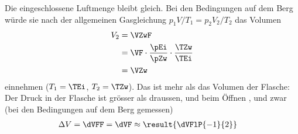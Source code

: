 Die eingeschlossene Luftmenge bleibt gleich. Bei den Bedingungen auf dem Berg würde sie nach der allgemeinen Gasgleichung $p_1V/T_1 = p_2V_2/T_2$ das Volumen
\begin{align}
 V_2 &= \VZwF \\
   &= \VF\cdot\frac{\pEi}{\pZw}\cdot\frac{\TZw}{\TEi} \\
   &= \VZw
\end{align}
einnehmen ($T_1 = \TEi$, $T_2 = \TZw$). Das ist mehr als das Volumen der Flasche: Der Druck in der Flasche ist grösser als draussen, und beim Öffnen , und zwar (bei den Bedingungen auf dem Berg gemessen)
\begin{align}
 \Delta V &= \dVFF = \dVF \approx \result{\dVFlP{-1}{2}}
\end{align}
